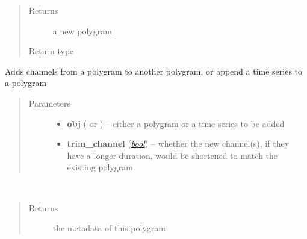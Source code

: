 \documentclass[letterpaper,10pt,english]{sphinxmanual}
\begin{document}
\begin{fulllineitems}
\begin{fulllineitems}
\begin{quote}
\begin{description}
\item[{Returns}] \leavevmode
a new polygram

\item[{Return type}] \leavevmode
{\hyperref[pyrem.polygram:pyrem.polygram.Polygram]{}}

\end{description}\end{quote}

\end{fulllineitems}


\begin{fulllineitems}
\label{pyrem.polygram:pyrem.polygram.Polygram.merge}
Adds channels from a polygram to another polygram, or append a time series to a polygram
\begin{quote}\begin{description}
\item[{Parameters}] \leavevmode\begin{itemize}
\item {} 
\textbf{obj} ({\hyperref[pyrem.polygram:pyrem.polygram.Polygram]{}} or {\hyperref[pyrem.time_series:pyrem.time_series.BiologicalTimeSeries]{}}) -- either a polygram or a time series to be added

\item {} 
\textbf{trim\_channel} (\href{http://docs.python.org/2.7/library/functions.html\#bool}{\emph{bool}}) -- whether the new channel(s), if they have a longer duration, would be shortened to match the existing polygram.

\end{itemize}

\end{description}\end{quote}

\end{fulllineitems}


\begin{fulllineitems}
\label{pyrem.polygram:pyrem.polygram.Polygram.metadata}~\begin{quote}\begin{description}
\item[{Returns}] \leavevmode
the metadata of this polygram


\end{description}
\end{quote}
\end{fulllineitems}
\end{fulllineitems}
\end{document}
